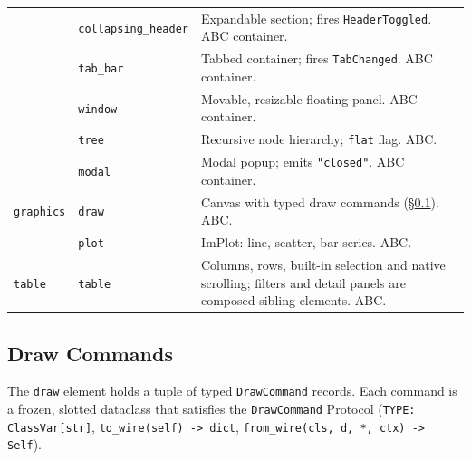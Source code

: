 \documentclass[a4paper,10pt]{article}
\newcommand{\elem}[1]{\texttt{#1}}
\newcommand{\field}[1]{\texttt{#1}}
\begin{document}
\begin{longtable}{llp{6cm}}
            & \elem{collapsing\_header} & Expandable section; fires
              \texttt{HeaderToggled}.  ABC container. \\
            & \elem{tab\_bar}          & Tabbed container; fires
              \texttt{TabChanged}.  ABC container. \\
            & \elem{window}            & Movable, resizable floating panel.
              ABC container. \\
            & \elem{tree}              & Recursive node hierarchy;
              \field{flat} flag.  ABC. \\
            & \elem{modal}             & Modal popup; emits \texttt{"closed"}.
              ABC container. \\
\midrule
\texttt{graphics}  & \elem{draw}              & Canvas with typed draw
              commands (\S\ref{sec:draw-commands}).  ABC. \\
            & \elem{plot}              & ImPlot: line, scatter, bar series.
              ABC. \\
\midrule
\texttt{table}     & \elem{table}             & Columns, rows, built-in
              selection and native scrolling; filters and detail panels
              are composed sibling elements. ABC. \\
\bottomrule
\end{longtable}

\subsection{Draw Commands}\label{sec:draw-commands}

The \elem{draw} element holds a tuple of typed \texttt{DrawCommand}
records.  Each command is a frozen, slotted dataclass that satisfies the
\texttt{DrawCommand} Protocol (\texttt{TYPE: ClassVar[str]},
\texttt{to\_wire(self) -> dict}, \texttt{from\_wire(cls, d, *, ctx) ->
Self}).
\end{document}
